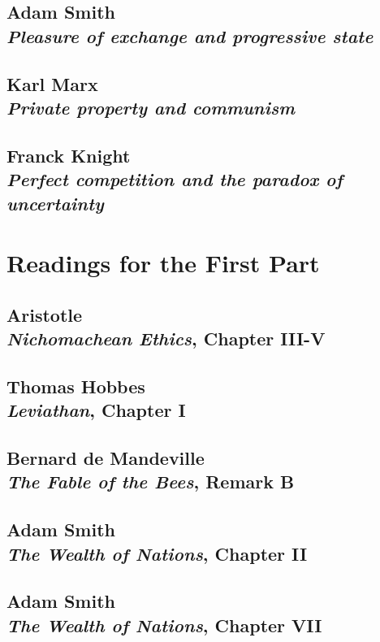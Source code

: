 \documentclass[dvipsnames,12pt]{book}
\begin{document}
        

    \chapter[Pleasure of exchange and progressive state]{Adam Smith \\[0.6cm] \textit{Pleasure of exchange and progressive state}}

        

    \chapter[Private property and communism]{Karl Marx \\[0.6cm] \textit{Private property and communism}}

    \chapter[Perfect competition and paradox of uncertainty]{Franck Knight\\[0.6cm] \textit{Perfect competition and the paradox of uncertainty}}

\part{Readings for the First Part}

    \setcounter{chapter}{0}
    \chapter[\textit{Nichomachean Ethics}, Chapter III-V]{Aristotle \\ \textit{Nichomachean Ethics}, Chapter III-V}

    \setcounter{chapter}{2}
    \chapter[\textit{Leviathan}, Chapter I]{Thomas Hobbes \\ \textit{Leviathan}, Chapter I}

    \chapter[\textit{The Fable of the Bees}, Remark B]{Bernard de Mandeville \\ \textit{The Fable of the Bees}, Remark B}

    \setcounter{chapter}{5}
    \chapter[\textit{The Wealth of Nations}, Chapter II]{Adam Smith \\ \textit{The Wealth of Nations}, Chapter II}

    \setcounter{chapter}{5}
    \chapter[\textit{The Wealth of Nations}, Chapter VII]{Adam Smith \\ \textit{The Wealth of Nations}, Chapter VII}

    
    
\end{document}

